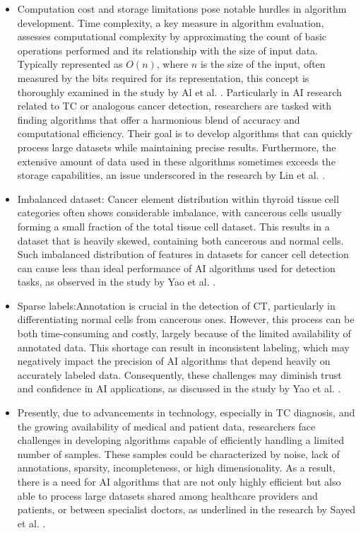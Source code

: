 \documentclass[a4paper,fleqn]{cas-sc}
\begin{document}
\begin{itemize}[leftmargin=*]
\item Computation cost and storage limitations pose notable hurdles in algorithm development. Time complexity, a key measure in algorithm evaluation, assesses computational complexity by approximating the count of basic operations performed and its relationship with the size of input data. Typically represented as $O(n)$, where $n$ is the size of the input, often measured by the bits required for its representation, this concept is thoroughly examined in the study by Al et al. \cite{al2021cost}. Particularly in \ac{AI} research related to TC or analogous cancer detection, researchers are tasked with finding algorithms that offer a harmonious blend of accuracy and computational efficiency. Their goal is to develop algorithms that can quickly process large datasets while maintaining precise results. Furthermore, the extensive amount of data used in these algorithms sometimes exceeds the storage capabilities, an issue underscored in the research by Lin et al. \cite{lin2021deep}.


\item Imbalanced dataset: Cancer element distribution within thyroid tissue cell categories often shows considerable imbalance, with cancerous cells usually forming a small fraction of the total tissue cell dataset. This results in a dataset that is heavily skewed, containing both cancerous and normal cells. Such imbalanced distribution of features in datasets for cancer cell detection can cause less than ideal performance of \ac{AI} algorithms used for detection tasks, as observed in the study by Yao et al. \cite{yao2022deepthy}.

\item Sparse labels:Annotation is crucial in the detection of \ac{CT}, particularly in differentiating normal cells from cancerous ones. However, this process can be both time-consuming and costly, largely because of the limited availability of annotated data. This shortage can result in inconsistent labeling, which may negatively impact the precision of \ac{AI} algorithms that depend heavily on accurately labeled data. Consequently, these challenges may diminish trust and confidence in \ac{AI} applications, as discussed in the study by Yao et al. \cite{yao2022deepthy}.

\item Presently, due to advancements in technology, especially in TC diagnosis, and the growing availability of medical and patient data, researchers face challenges in developing algorithms capable of efficiently handling a limited number of samples. These samples could be characterized by noise, lack of annotations, sparsity, incompleteness, or high dimensionality. As a result, there is a need for \ac{AI} algorithms that are not only highly efficient but also able to process large datasets shared among healthcare providers and patients, or between specialist doctors, as underlined in the research by Sayed et al. \cite{sayed2023time}.


\end{itemize}
\end{document}
